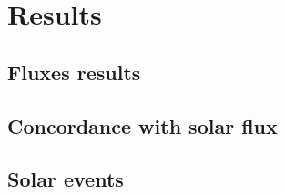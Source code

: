 \section{Results}
    \subsection{Fluxes results}
    \subsection{Concordance with solar flux}
    \subsection{Solar events}